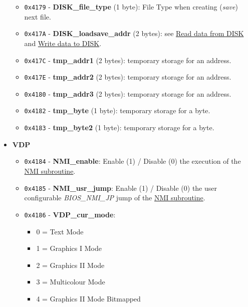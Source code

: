 \begin{itemize}
\begin{itemize}
\begin{itemize}
                \end{itemize}
                \item \texttt{0x4179} - \textbf{DISK\_file\_type} (1 byte): File
                Type when creating (\textit{save}) next file.
                \item \texttt{0x417A} - \textbf{DISK\_loadsave\_addr} (2 bytes): see
                \hyperref[sec:howto_readdata]{Read data from DISK} and 
                \hyperref[sec:howto_writedata]{Write data to DISK}.
                \item \texttt{0x417C} - \textbf{tmp\_addr1} (2 bytes): temporary
                storage for an address.
                \item \texttt{0x417E} - \textbf{tmp\_addr2} (2 bytes): temporary
                storage for an address.
                \item \texttt{0x4180} - \textbf{tmp\_addr3} (2 bytes): temporary
                storage for an address.
                \item \texttt{0x4182} - \textbf{tmp\_byte} (1 byte): temporary
                storage for a byte.
                \item \texttt{0x4183} - \textbf{tmp\_byte2} (1 byte): temporary
                storage for a byte.
            \end{itemize}
            \item \textbf{VDP}
            \begin{itemize}
                \item \texttt{0x4184} - \textbf{NMI\_enable}: Enable (1) / Disable
                (0) the execution of the \hyperref[sec:nmi]{NMI subroutine}.
                \item \texttt{0x4185} - \textbf{NMI\_usr\_jump}: Enable (1) / Disable
                (0) the user configurable \textit{BIOS\_NMI\_JP} jump of the 
                \hyperref[sec:nmi]{NMI subroutine}.
                \item \texttt{0x4186} - \textbf{VDP\_cur\_mode}:
                \begin{itemize}
                    \item 0 = Text Mode
                    \item 1 = Graphics I Mode
                    \item 2 = Graphics II Mode
                    \item 3 = Multicolour Mode
                    \item 4 = Graphics II Mode Bitmapped
                \end{itemize}

\end{itemize}
\end{itemize}
